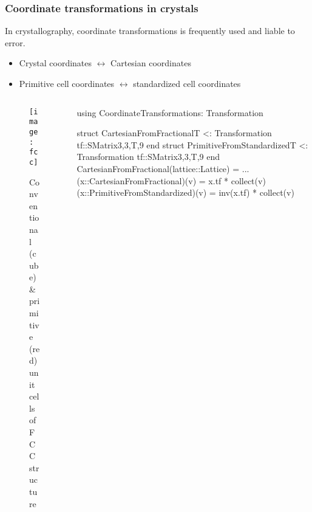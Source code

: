 \begin{frame}[fragile]
    \frametitle{Coordinate transformations in crystals}

    In crystallography, coordinate transformations is frequently used and liable to error.
    \begin{itemize}
        \item Crystal coordinates $\leftrightarrow$ Cartesian coordinates
        \item Primitive cell coordinates $\leftrightarrow$ standardized cell coordinates
    \end{itemize}

    \begin{columns}[t]
        \begin{column}[T, onlytextwidth]{0.2\textwidth}
            \begin{figure}
                \texttt{[image: fcc]}
                \captionsetup{font=tiny}
                \caption{Conventional (cube) \& primitive (red) unit cells of FCC structure}
            \end{figure}
        \end{column}

        \begin{column}[T]{0.8\textwidth}
            {\scriptsize
                \begin{algorithmblock}
                    \begin{juliaverbatim}
using CoordinateTransformations: Transformation

struct CartesianFromFractional{T} <: Transformation
    tf::SMatrix{3,3,T,9}
end
struct PrimitiveFromStandardized{T} <: Transformation
    tf::SMatrix{3,3,T,9}
end
CartesianFromFractional(lattice::Lattice) = ...
(x::CartesianFromFractional)(v) = x.tf * collect(v)
(x::PrimitiveFromStandardized)(v) = inv(x.tf) * collect(v)
        \end{juliaverbatim}
                \end{algorithmblock}
            }
        \end{column}
    \end{columns}
\end{frame}
